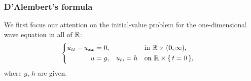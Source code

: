\subsubsection{D'Alembert's formula}
We first focus our attention on the initial-value problem for the
one-dimensional wave equation in all of \(\mathbb{R}\):
\begin{equation}
  \label{eq:pde:oned-wave-equation}
  \left\{
    \begin{aligned}
      u_{tt}-u_{xx}&=0,&&&&\text{in \(\mathbb{R}\times(0,\infty)\)},\\
      u&=g,&u_t,&=h&&\text{on \(\mathbb{R}\times\{\,t=0\,\}\)},
    \end{aligned}
\right.
\end{equation}
where \(g\), \(h\) are given.

